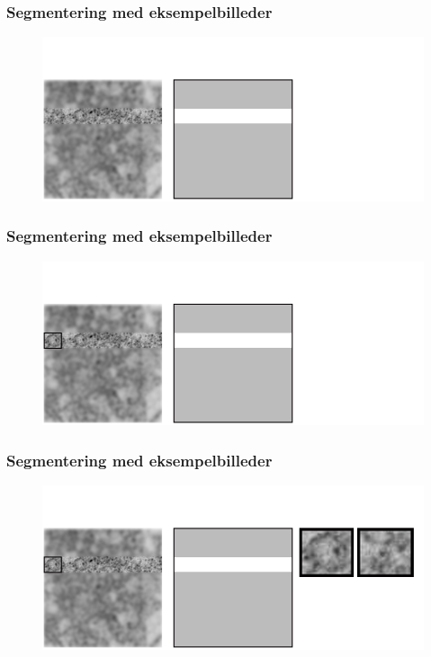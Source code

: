 \documentclass[12pt,t]{beamer}
\begin{document}
\begin{frame}
\frametitle{Segmentering med eksempelbilleder}
\begin{figure}[H]
\includegraphics[scale=0.35]{img/afstand/4.png}
\end{figure}
\end{frame}

\begin{frame}
\frametitle{Segmentering med eksempelbilleder}
\begin{figure}[H]
\includegraphics[scale=0.35]{img/afstand/5.png}
\end{figure}
\end{frame}


\begin{frame}
\frametitle{Segmentering med eksempelbilleder}
\begin{figure}[H]
\includegraphics[scale=0.35]{img/afstand/6.png}
\end{figure}
\end{frame}
\end{document}
